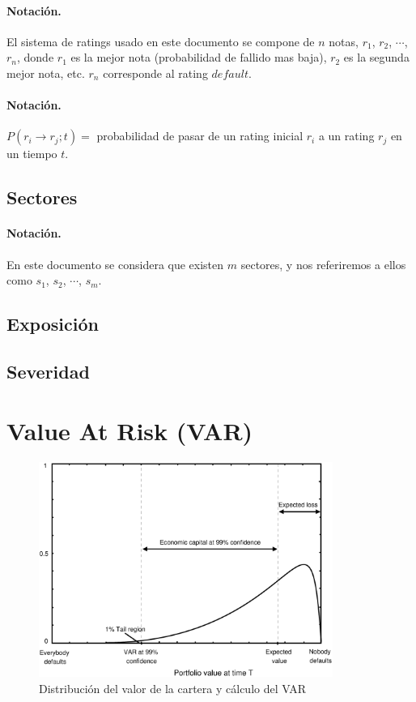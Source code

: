 \paragraph{Notaci\'on.} El sistema de ratings usado en este documento se 
compone de $n$ notas, $r_1$, $r_2$, $\cdots$, $r_n$, donde $r_1$ es la
mejor nota (probabilidad de fallido mas baja), $r_2$ es la segunda mejor nota, 
etc. $r_n$ corresponde al rating $default$.

\paragraph{Notaci\'on.} $P(r_i \to r_j;t) =$ probabilidad de pasar de un 
rating inicial $r_i$ a un rating $r_j$ en un tiempo $t$.


\subsection{Sectores}

\paragraph{Notaci\'on.} En este documento se considera que existen $m$ 
sectores, y nos referiremos a ellos como $s_1$, $s_2$, $\cdots$, $s_m$.

\subsection{Exposici\'on}

\subsection{Severidad}


\section{Value At Risk (VAR)}

\begin{figure}[!hb]
\begin{center}
\includegraphics[height=7cm, angle=0]{./images/creditvar.eps}
\caption{Distribuci\'on del valor de la cartera y c\'alculo del VAR}
\label{creditvar}
\end{center}
\end{figure}

